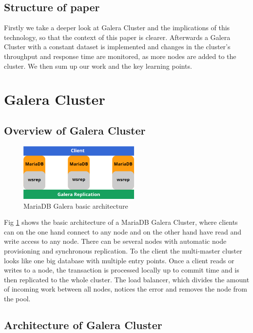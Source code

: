 \documentclass{sig-alternate}
\begin{document}
\bigskip

\subsection{Structure of paper}
Firstly we take a deeper look at Galera Cluster and the implications of this technology, so that the context of this paper is clearer. Afterwards a Galera Cluster with a constant dataset is implemented and changes in the cluster’s throughput and response time are monitored, as more nodes are added to the cluster. We then sum up our work and the key learning points.

\section{Galera Cluster}
\subsection{Overview of Galera Cluster}

\begin{figure}[ht]
	\centering
	\includegraphics[width=6cm]{galera1-2.png}
	\caption{MariaDB Galera basic architecture}
	\label{fig:galera_structure}
\end{figure}

Fig \ref{fig:galera_structure} shows the basic architecture of a MariaDB Galera Cluster, where clients can on the one hand connect to any node and on the other hand have read and write access to any node. There can be several nodes with automatic node provisioning and synchronous replication. To the client the multi-master cluster looks like one big database with multiple entry points. Once a client reads or writes to a node, the transaction is processed locally up to commit time and is then replicated to the whole cluster. The load balancer, which divides the amount of incoming work between all nodes, notices the error and removes the node from the pool.

\subsection{Architecture of Galera Cluster}
\end{document}
